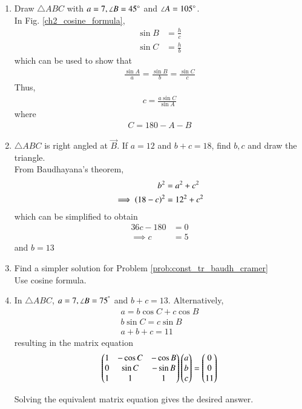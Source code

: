 \begin{enumerate}[label=\arabic*.,ref=\thesubsection.\theenumi]
\item Draw $\triangle ABC$ with $a = 7, \angle B = 45\degree$ and $\angle A = 105 \degree$. 
\\
\solution In Fig. \eqref{ch2_cosine_formula},	
\begin{align}
\label{eq:sin_form_def}
\sin B &= \frac{h}{c}
\\
\sin C &= \frac{h}{b}
\end{align}
%
which can be used to show that
\begin{align}
\label{eq:sin_form}
\frac{\sin A}{a}=\frac{\sin B}{b}=\frac{\sin C}{c}
\end{align}
%
Thus, 
\begin{align}
c = \frac{a\sin C}{\sin A}
\end{align}
where
\begin{align}
C = 180-A-B
\end{align}
\item $\triangle ABC$ is right angled at $\vec{B}$.  If $a = 12$ and $b+c = 18$, find $b,c$ and draw the triangle.
\\
\solution From Baudhayana's theorem, 
\begin{align}
b^2 &= a^2 + c^2
\\
\implies \left(18-c\right)^2 &= 12^2 +c^2
\end{align}
which can be simplified to obtain
\begin{align}
 36c -180&= 0
\\
\implies c&=5
\end{align}
%
and $b = 13$
\item Find a simpler solution for  Problem \ref{prob:const_tr_baudh_cramer} 
\\
\solution Use cosine formula.
\item In $\triangle ABC$,  $a = 7, \angle B = 75^{\degree}$ and $b+c = 13$. 
Alternatively, 
\begin{align}
a = b \cos C + c \cos B
\\
b \sin C = c \sin B
\\
a + b+c = 11
\end{align}
%
resulting  in the matrix equation 
\begin{align}
\begin{pmatrix}
1 & -\cos C & - \cos B
\\
0 & \sin C &- \sin B
\\
1 & 1 & 1
\end{pmatrix}
\begin{pmatrix}a \\b\\c\end{pmatrix} = \begin{pmatrix}0 \\ 0 \\ 11\end{pmatrix}
\end{align}

Solving the equivalent matrix equation gives the desired answer.

\end{enumerate}
%
